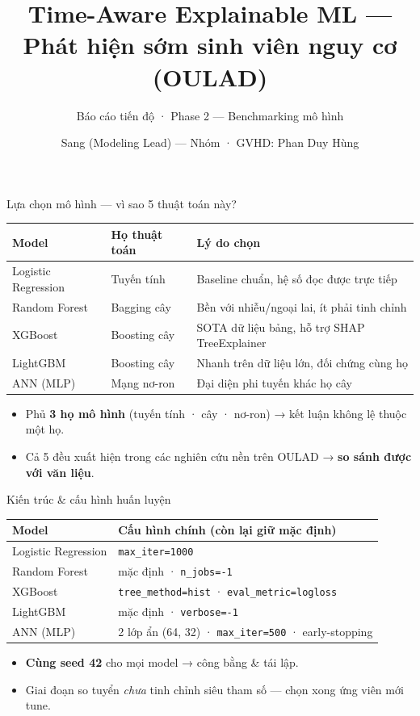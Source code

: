 \documentclass[aspectratio=169,11pt]{beamer}
\title{Time-Aware Explainable ML —\\Phát hiện sớm sinh viên nguy cơ (OULAD)}
\subtitle{Báo cáo tiến độ · Phase 2 — Benchmarking mô hình}
\author{Sang (Modeling Lead) — Nhóm · GVHD: Phan Duy Hùng}
\institute{Đại học FPT · DSP391m}
\date{}
\begin{document}
\begin{frame}\titlepage\end{frame}

\begin{frame}{Lựa chọn mô hình — vì sao 5 thuật toán này?}
\small
\begin{tabular}{@{}lll@{}}
\toprule
\textbf{Model} & \textbf{Họ thuật toán} & \textbf{Lý do chọn} \\
\midrule
Logistic Regression & Tuyến tính & Baseline chuẩn, hệ số đọc được trực tiếp \\
Random Forest & Bagging cây & Bền với nhiễu/ngoại lai, ít phải tinh chỉnh \\
XGBoost & Boosting cây & SOTA dữ liệu bảng, hỗ trợ SHAP TreeExplainer \\
LightGBM & Boosting cây & Nhanh trên dữ liệu lớn, đối chứng cùng họ \\
ANN (MLP) & Mạng nơ-ron & Đại diện phi tuyến khác họ cây \\
\bottomrule
\end{tabular}
\vspace{4mm}
\begin{itemize}
  \item Phủ \textbf{3 họ mô hình} (tuyến tính · cây · nơ-ron) → kết luận không lệ thuộc một họ.
  \item Cả 5 đều xuất hiện trong các nghiên cứu nền trên OULAD → \textbf{so sánh được với văn liệu}.
\end{itemize}
\end{frame}

\begin{frame}{Kiến trúc \& cấu hình huấn luyện}
\small
\begin{tabular}{@{}ll@{}}
\toprule
\textbf{Model} & \textbf{Cấu hình chính (còn lại giữ mặc định)} \\
\midrule
Logistic Regression & \texttt{max\_iter=1000} \\
Random Forest & mặc định · \texttt{n\_jobs=-1} \\
XGBoost & \texttt{tree\_method=hist} · \texttt{eval\_metric=logloss} \\
LightGBM & mặc định · \texttt{verbose=-1} \\
ANN (MLP) & 2 lớp ẩn (64, 32) · \texttt{max\_iter=500} · early-stopping \\
\bottomrule
\end{tabular}
\vspace{4mm}
\begin{itemize}
  \item \textbf{Cùng seed 42} cho mọi model → công bằng \& tái lập.
  \item Giai đoạn so tuyển \emph{chưa} tinh chỉnh siêu tham số — chọn xong ứng viên mới tune.
\end{itemize}
\end{frame}
\end{document}
